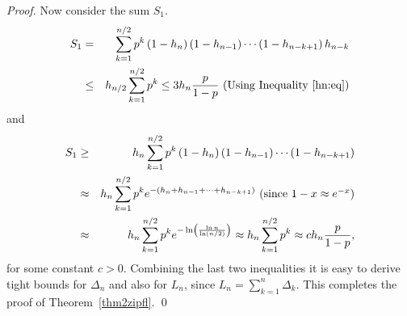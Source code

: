 \documentclass[11pt]{llncs}
\begin{document}
\begin{proof}
Now consider the sum $S_1$.
\begin{eqnarray}
S_1
&=& \notag
\sum_{k=1}^{n/2} p^k  \left( 1 - h_n \right) \left( 1 - h_{n-1} \right) \cdots \left( 1 - h_{n-k+1} \right) h_{n-k}\\
&\leq& \notag
h_{n/2} \sum_{k=1}^{n/2} p^k \leq 3 h_n \frac{p}{1-p} \mbox{ (Using Inequality~\eqref{hn:eq})} 
\end{eqnarray}
and
\begin{eqnarray}
S_1
&\geq& \notag
h_n \sum_{k=1}^{n/2} p^k  \left( 1 - h_n \right) \left( 1 - h_{n-1} \right) \cdots \left( 1 - h_{n-k+1} \right) \\
&\approx& \notag
h_n \sum_{k=1}^{n/2} p^k  e^{-(h_n +h_{n-1}+ \cdots + h_{n-k+1})} \mbox{ (since $1-x \approx e^{-x}$)} \\
&\approx& \notag
h_n \sum_{k=1}^{n/2} p^k  e^{- \ln \left( \frac{\ln n}{\ln (n/2)} \right)} 
\approx
h_n \sum_{k=1}^{n/2} p^k 
\approx
c h_n \frac{p}{1-p},
\end{eqnarray}
for some constant $c>0$.
Combining the last two inequalities it is easy to derive tight
bounds for $\Delta_n$ and also for $L_n$, since
$L_n = \sum_{k=1}^n \Delta_k$.
This completes the proof of Theorem~\ref{thm2zipfl}.
\qed
\end{proof}










\begin{comment}
Next we give the recurrence
for the Zipf distribution 
with right bias.
\begin{theorem}[Zipf with right bias]
\label{thm2zipfr}
The expected number of occupied seats by $p$-courteous theatregoers
in an arrangement of $n$ seats
in a row with single entrance is equal to $\fbox{?????}$, asymptotically in $n$.
\end{theorem}
\begin{proof}
Let $R_n$ be the expected number of theatregoers occupying seats 
in a row of $n$ seats,
when seating is biased to the right,
Observe that $R_0=0, R_1 =1$ and that the following recurrence is valid
for all $n \geq 1$.
\begin{eqnarray}
R_n 
&=& \notag
1 + p R_{n-1} + \frac{1-p}{H_n} \sum_{k=1}^{n} \frac{1}{n+1-k} R_{k-1}\\
&=&  \label{maineq2zzipf} 
1 + p R_{n-1} + \frac{1-p}{H_n} \sum_{k=1}^{n-1} \frac{1}{n-k} R_{k}
\end{eqnarray}
It turns out that
for this case the recurrence
is harder to solve.
\qed
\end{proof}
\end{comment}
\end{document}
